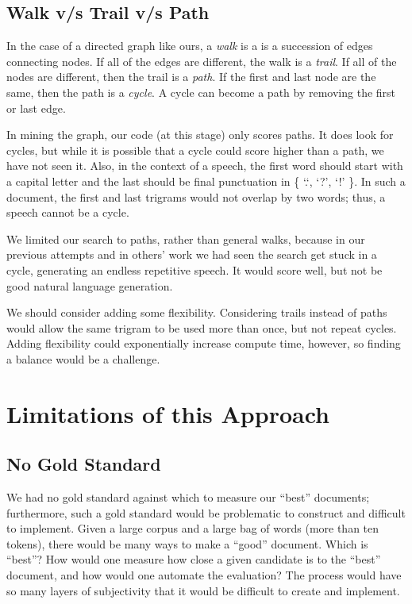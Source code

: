 \documentclass[11pt]{article}
\begin{document}
\subsection{Walk v/s Trail v/s Path}

In the case of a directed graph like ours, a {\it walk} is a is a succession of edges connecting nodes.  If all of the edges are different, the walk is a {\it trail}.  If all of the nodes are different, then the trail is a {\it path}.  If the first and last node are the same, then the path is a {\it cycle}.  A cycle can become a path by removing the first or last edge.  \cite{Wilson:90}

In mining the graph, our code (at this stage) only scores paths.  It does look for cycles, but while it is possible that a cycle could score higher than a path, we have not seen it.  Also, in the context of a speech, the first word should start with a capital letter and the last should be final punctuation in \{ `.`, `?', `!' \}.  In such a document, the first and last trigrams would not overlap by two words; thus, a speech cannot be a cycle.  

We limited our search to paths, rather than general walks, because in our previous attempts and in others' work we had seen the search get stuck in a cycle, generating an endless repetitive speech.  It would score well, but not be good natural language generation.  

We should consider adding some flexibility.  Considering trails instead of paths would allow the same trigram to be used more than once, but not repeat cycles.  Adding flexibility could exponentially increase compute time, however, so finding a balance would be a challenge.  




\section{Limitations of this Approach}

\subsection{No Gold Standard}

We had no gold standard against which to measure our ``best'' documents; furthermore, such a gold standard would be problematic to construct and difficult to implement.  Given a large corpus and a large bag of words (more than ten tokens), there would be many ways to make a ``good'' document.  Which is ``best''?  How would one measure how close a given candidate is to the ``best'' document, and how would one automate the evaluation?  The process would have so many layers of subjectivity that it would be difficult to create and implement.  
\end{document}

